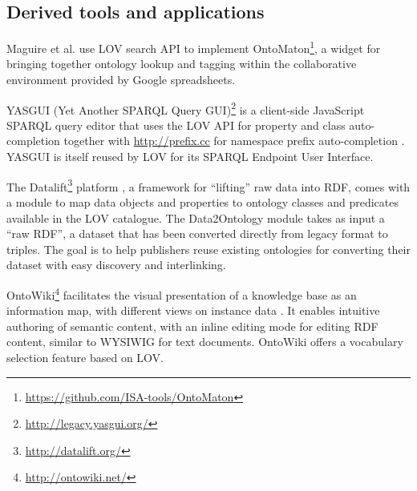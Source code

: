 \documentclass{iosart2c}
\begin{document}
\subsection{Derived tools and applications}

Maguire et al. \cite{ontomaton12} use LOV search API to implement OntoMaton\footnote{\url{https://github.com/ISA-tools/OntoMaton}}, a widget for bringing together ontology lookup and tagging within the collaborative environment provided by Google spreadsheets. 

YASGUI (Yet Another SPARQL Query GUI)\footnote{\url{http://legacy.yasgui.org/}} is a client-side JavaScript SPARQL query editor that uses the LOV API for property and class auto-completion together with \url{http://prefix.cc} for namespace prefix auto-completion \cite{yasgui}. YASGUI is itself reused by LOV for its SPARQL Endpoint User Interface.

The Datalift\footnote{\url{http://datalift.org/}} platform \cite{scharffe_2012}, a framework for ``lifting'' raw data into RDF, comes with a module to map data objects and properties to ontology classes and predicates available in the LOV catalogue. The Data2Ontology module takes as input a ``raw RDF'', a dataset that has been converted directly from legacy format to triples. The goal is to help publishers reuse existing ontologies for converting their dataset with easy discovery and interlinking. 

OntoWiki\footnote{\url{http://ontowiki.net/}} facilitates the visual presentation of a knowledge base as an information map, with different views on instance data \cite{auer2006ontowiki}. It enables intuitive authoring of semantic content, with an inline editing mode for editing RDF content, similar to WYSIWIG for text documents. OntoWiki offers a vocabulary selection feature based on LOV.
\end{document}
